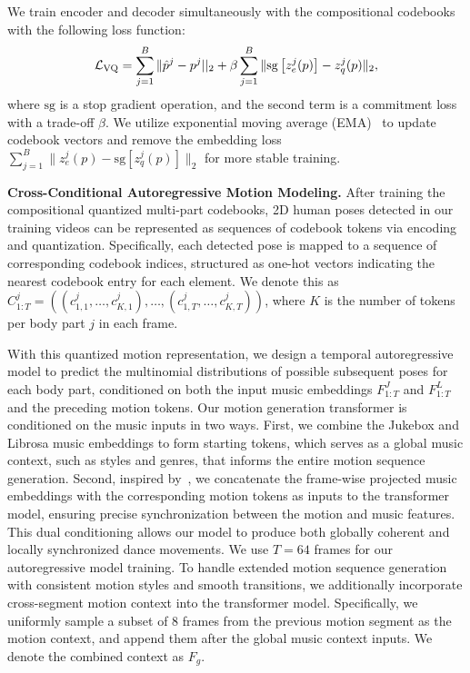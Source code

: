 We train encoder and decoder simultaneously with the compositional codebooks with the following loss function:
\vspace{-3mm}
\begin{equation}
    \mathcal{L}_{\text{VQ}} = \sum_{j=1}^B \| \hat{p}^j - p^j ||_2 + \beta \sum_{j=1}^B \|\mathrm{sg} \left[z^j_e(p)\right] -  z^j_q(p) \|_2,
\vspace{-2mm}
\end{equation}
where $\mathrm{sg}$ is a stop gradient operation, and the second term is a commitment loss with a trade-off $\beta.$ We utilize exponential moving average (EMA)~\cite{vqvae} to update codebook vectors and remove the embedding loss $\sum_{j=1}^B \|z^j_e(p) - \mathrm{sg} \left[z^j_q(p)\right] \|_2$ for more stable training. 

\vspace{2mm}
\noindent\textbf{Cross-Conditional Autoregressive Motion Modeling.}
After training the compositional quantized multi-part codebooks, 2D human poses detected in our training videos can be represented as sequences of codebook tokens via encoding and quantization. Specifically, each detected pose is mapped to a sequence of corresponding codebook indices, structured as one-hot vectors indicating the nearest codebook entry for each element. We denote this as $C^j_{1:T} = ((c^j_{1, 1}, …, c^j_{K, 1}), \ldots, (c^j_{1, T},\ldots, c^j_{K, T}))$, 
where $K$ is the number of tokens per body part $j$ in each frame.

With this quantized motion representation, we design a temporal autoregressive model to predict the multinomial distributions of possible subsequent poses for each body part, conditioned on both the input music embeddings $F^{J}_{1:T}$ and $F^{L}_{1:T}$ and the preceding motion tokens. Our motion generation transformer is conditioned on the music inputs in two ways. First, we combine the Jukebox and Librosa music embeddings to form starting tokens, which serves as a global music context, such as styles and  genres, that informs the entire motion sequence generation. Second,  inspired by~\cite{bailando}, we concatenate the frame-wise projected music embeddings with the corresponding motion tokens as inputs to the transformer model, ensuring precise synchronization between the motion and music features. This dual conditioning allows our model to produce both globally coherent and locally synchronized dance movements. We use $T=64$ frames for our autoregressive model training. To handle extended motion sequence generation with consistent motion styles and smooth transitions, we additionally incorporate cross-segment motion context into the transformer model. Specifically, we uniformly sample a subset of 8 frames from the previous motion segment as the motion context, and append them after the global music context inputs. We denote the combined context as $F_g.$

